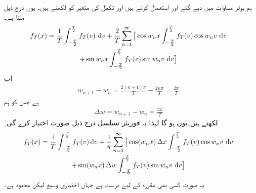 ہم یولر مساوات  میں دیے گئے  اور  استعمال کرتے ہیں اور تکمل کی متغیر کو  لکھتے ہیں۔ یوں درج ذیل ملتا ہے۔
\begin{multline*}
f_T(x)=\frac{1}{T}\int_{-\frac{T}{2}}^{\frac{T}{2}} f_T(v)\,\dif v+\frac{2}{T}\sum\limits_{n=1}^{\infty}\big[\cos w_nx\int_{-\frac{T}{2}}^{\frac{T}{2}}f_T(v)\cos w_nv\,\dif v\\
+\sin w_nx\int_{-\frac{T}{2}}^{\frac{T}{2}}f_T(v)\sin w_nv\,\dif v\big]
\end{multline*}
اب
\begin{align*}
w_{n+1}-w_n=\frac{2(n+1)\pi}{T}-\frac{2n\pi}{T}=\frac{2\pi}{T}
\end{align*}
ہے  جس کو ہم 
\begin{align*}
\Delta w=w_{n+1}-w_n=\frac{2\pi}{T}
\end{align*}
لکھتے ہیں۔یوں  ہو گا لہٰذا یہ فوریئر تسلسل  درج ذیل صورت اختیار کرے گی۔
\begin{multline}\label{مساوات_فوریئر_تکمل_الف}
f_T(x)=\frac{1}{T}\int_{-\frac{T}{2}}^{\frac{T}{2}} f_T(v)\dif v+\frac{1}{\pi}\sum\limits_{n=1}^{\infty}\big[ \cos(w_n x)\,\Delta x\int_{-\frac{T}{2}}^{\frac{T}{2}}f_T(v)\cos w_nv\,\dif v\\
+\sin (w_nx)\,\Delta w\int_{-\frac{T}{2}}^{\frac{T}{2}}f_T(v)\sin w_nv\,\dif v\big]
\end{multline}
یہ صورت کسی بھی مقررہ  کے لیے درست ہے جہاں  اختیاری وسیع لیکن محدود ہے۔

